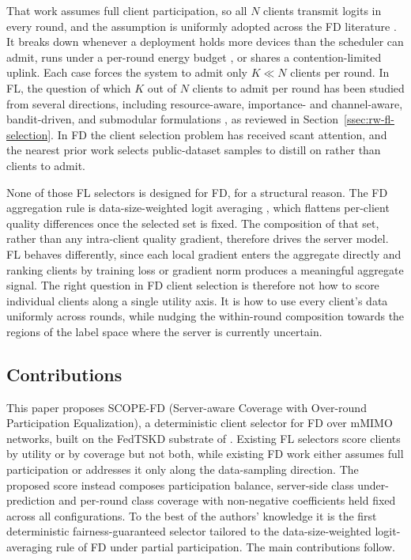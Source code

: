 \documentclass[journal]{IEEEtran}
\newcommand{\new}[1]{#1}
\newcommand{\revIVE}[1]{#1}
\newcommand{\rev}[1]{{\color{blue}#1}}
\begin{document}
That work assumes full client participation, so all $N$ clients transmit logits in every round, and the assumption is uniformly adopted across the FD literature \cite{itahara2023distillation, sattler2022cfd, sattler2023fedaux, wu2024fedict}. It breaks down whenever a deployment holds more devices than the scheduler can admit, runs under a per-round energy budget \rev{\cite{thakur2026grace}}, or shares a contention-limited uplink. Each case forces the system to admit only $K \ll N$ clients per round. \new{In FL, the question of which $K$ out of $N$ clients to admit per round has been studied from several directions, including resource-aware, importance- and channel-aware, bandit-driven, and submodular formulations \cite{nishio2019client, yang2020scheduling, ren2020scheduling, shi2020joint, xia2020mab, cho2020bandit, balakrishnan2022divfl}, as reviewed in Section~\ref{ssec:rw-fl-selection}.} In FD the client selection problem has received scant attention, and the nearest prior work \cite{liu2022active} selects public-dataset samples to distill on rather than clients to admit.

None of those FL selectors is designed for FD, for a structural reason. The FD aggregation rule is data-size-weighted logit averaging \cite{mu2024fedtskd, itahara2023distillation}, which flattens per-client quality differences once the selected set is fixed. The composition of that set, rather than any intra-client quality gradient, therefore drives the server model. FL behaves differently, since each local gradient enters the aggregate directly and ranking clients by training loss \cite{cho2020bandit, xia2020mab} or gradient norm \cite{ren2020scheduling} produces a meaningful aggregate signal. The right question in FD client selection is therefore not how to score individual clients along a single utility axis. It is how to use every client's data uniformly across rounds, while nudging the within-round composition towards the regions of the label space where the server is currently uncertain.

\subsection{Contributions}
\label{ssec:contributions}

This paper proposes SCOPE-FD (Server-aware Coverage with Over-round Participation Equalization), a deterministic client selector for FD over mMIMO networks, built on the FedTSKD substrate of \cite{mu2024fedtskd}. Existing FL selectors \cite{nishio2019client, cho2020bandit, xia2020mab, balakrishnan2022divfl} score clients by utility or by coverage but not both, while existing FD work \cite{mu2024fedtskd, itahara2023distillation, liu2022active} either assumes full participation or addresses it only along the data-sampling direction. The proposed score instead composes participation balance, server-side class under-prediction and per-round class coverage \revIVE{with non-negative coefficients held fixed across all configurations}. To the best of the authors' knowledge it is the first deterministic fairness-guaranteed selector tailored to the data-size-weighted logit-averaging rule of FD under partial participation. The main contributions follow.
\end{document}
